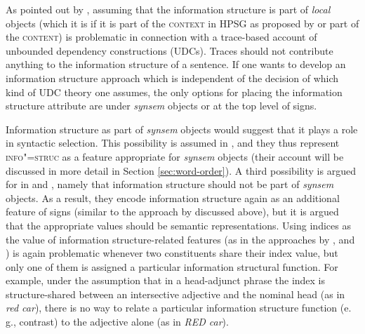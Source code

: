 \documentclass[output=paper,biblatex,babelshorthands,newtxmath,draftmode,colorlinks,citecolor=brown]{langscibook}
\begin{document}
As pointed out by \citet{deKuthy2002a}, assuming that the information
structure is part of \textit{local} objects (which it is if it is part
of the \textsc{context} in HPSG as proposed by \citealt{EV96a} or part of
the \textsc{content}) is problematic in connection with a trace-based
account of unbounded dependency constructions (UDCs). Traces should not contribute
anything to the information structure of a sentence. If one wants to
develop an information structure approach which is independent of the
decision of which kind of UDC theory one assumes, the only options for
placing the information structure attribute are under \textit{synsem}
objects or at the top level of signs.

Information structure as part of \textit{synsem} objects would suggest
that it plays a role in syntactic selection. This possibility is
assumed in , and they thus represent
\textsc{info"=struc} as a feature appropriate for \textit{synsem}
objects (their account will be discussed in more detail in Section
\ref{sec:word-order}).  A third possibility is argued for in
 and , namely that information
structure should not be part of \textit{synsem} objects. As a result,
they encode information structure again as an additional feature of
signs (similar to the approach by \citealt{Manandhar94a-u} discussed above), but
it is argued that the appropriate values should be semantic
representations. Using indices as the value of information
structure-related features (as in the approaches by
\citealt{Paggio2009a-u}, \citealt{song-bender:2012} and \citealt{song2018}) is again
problematic whenever two constituents share their index value, but
only one of them is assigned a particular information structural
function. For example, under the assumption that in a head-adjunct
phrase the index is structure-shared between an intersective adjective
and the nominal head (as in \textit{red car}), there is no way to
relate a particular information structure function (e. g., contrast) to the adjective
alone (as in \textit{RED car}).
\end{document}
